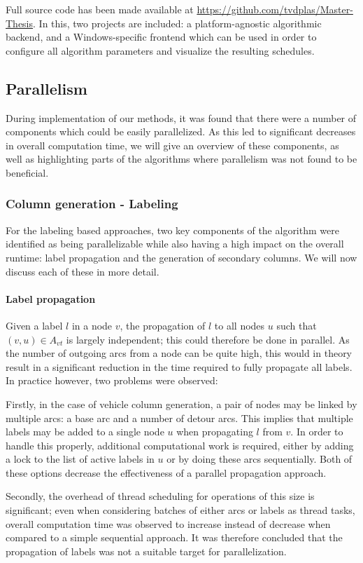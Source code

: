 \documentclass[]{article}
\begin{document}
Full source code has been made available at \url{https://github.com/tvdplas/Master-Thesis}. In this, two projects are included: a platform-agnostic algorithmic backend, and a Windows-specific frontend which can be used in order to configure all algorithm parameters and visualize the resulting schedules.

\subsection{Parallelism}
During implementation of our methods, it was found that there were a number of components which could be easily parallelized. As this led to significant decreases in overall computation time, we will give an overview of these components, as well as highlighting parts of the algorithms where parallelism was not found to be beneficial.

\subsubsection{Column generation - Labeling}
For the labeling based approaches, two key components of the algorithm were identified as being parallelizable while also having a high impact on the overall runtime: label propagation and the generation of secondary columns. We will now discuss each of these in more detail. 

\paragraph{Label propagation}
Given a label $l$ in a node $v$, the propagation of $l$ to all nodes $u$ such that $(v, u) \in A_{vt}$ is largely independent; this could therefore be done in parallel. As the number of outgoing arcs from a node can be quite high, this would in theory result in a significant reduction in the time required to fully propagate all labels. In practice however, two problems were observed: 

Firstly, in the case of vehicle column generation, a pair of nodes may be linked by multiple arcs: a base arc and a number of detour arcs. This implies that multiple labels may be added to a single node $u$ when propagating $l$ from $v$. In order to handle this properly, additional computational work is required, either by adding a lock to the list of active labels in $u$ or by doing these arcs sequentially. Both of these options decrease the effectiveness of a parallel propagation approach. 

Secondly, the overhead of thread scheduling for operations of this size is significant; even when considering batches of either arcs or labels as thread tasks, overall computation time was observed to increase instead of decrease when compared to a simple sequential approach. It was therefore concluded that the propagation of labels was not a suitable target for parallelization.
\end{document}
